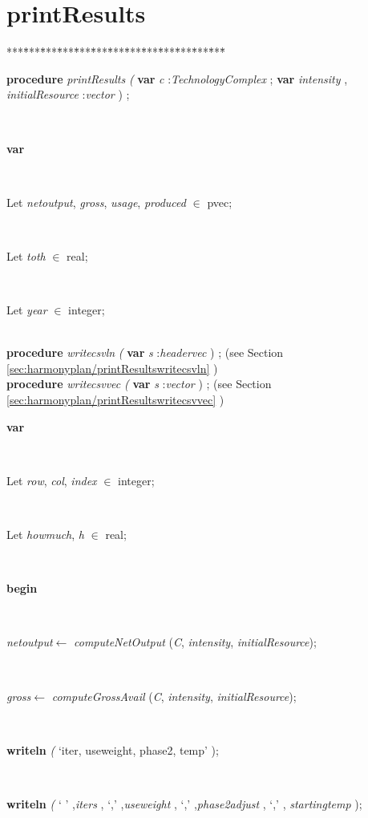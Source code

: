 \documentclass[10pt, a4paper]{article}
\begin{document}
\section{printResults}\label{sec:harmonyplanprintResults}

\begin{tabbing}
***\=***\=***\=***\=***\=***\=***\=***\=***\=***\=***\=***\=***\=\kill
\parbox{14cm}{\textsf{\textbf{procedure}  \textit{printResults} \textit{(} \textbf{var}  \textit{c} :\textit{TechnologyComplex} ; \textbf{var}  \textit{intensity} ,  \textit{initialResource} :\textit{vector} ) ;}}\\
\+\parbox{14cm}{\textsf{\textbf{var} }}\\
\parbox{14cm}{\textsf{Let \textit{netoutput}, \textit{gross}, \textit{usage}, \textit{produced} $\in$ pvec;}}\\
\parbox{14cm}{\textsf{Let \textit{toth} $\in$ real;}}\\
\parbox{14cm}{\textsf{Let \textit{year} $\in$ integer;}}\\
\<\textsf{\textbf{procedure}  \textit{writecsvln} \textit{(} \textbf{var}  \textit{s} :\textit{headervec} ) ;} (see Section \ref{sec:harmonyplan/printResultswritecsvln} )\\
\<\textsf{\textbf{procedure}  \textit{writecsvvec} \textit{(} \textbf{var}  \textit{s} :\textit{vector} ) ;} (see Section \ref{sec:harmonyplan/printResultswritecsvvec} )\\
\<\parbox{14cm}{\textsf{\textbf{var} }}\\
\parbox{14cm}{\textsf{Let \textit{row}, \textit{col}, \textit{index} $\in$ integer;}}\\
\parbox{14cm}{\textsf{Let \textit{howmuch}, \textit{h} $\in$ real;}}\\
\-\<\+\parbox{14cm}{\textsf{\textbf{begin} }}\\
\parbox{14cm}{\textsf{\textit{netoutput}$\leftarrow$ \textit{computeNetOutput} (\textit{C}, \textit{intensity}, \textit{initialResource})}; }\\
\parbox{14cm}{\textsf{\textit{gross}$\leftarrow$ \textit{computeGrossAvail} (\textit{C}, \textit{intensity}, \textit{initialResource})}; }\\
\parbox{14cm}{\textsf{\textbf{writeln} \textit{(} \textrm{\textup { `iter,	useweight,	phase2,	temp' } });}}\\
\parbox{14cm}{\textsf{\textbf{writeln} \textit{(} \textrm{\textup { ` ' } },\textit{iters} ,\textrm{\textup { `,' } },\textit{useweight} ,\textrm{\textup { `,' } },\textit{phase2adjust} ,\textrm{\textup { `,' } }, \textit{startingtemp} );}}\\

\end{tabbing}
\end{document}
